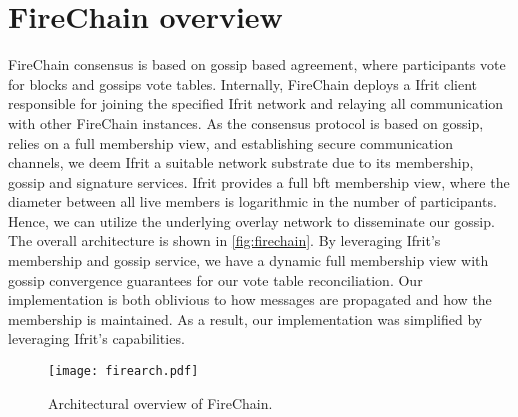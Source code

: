 \documentclass[USenglish]{uit-thesis}
\begin{document}


\section{FireChain overview}
FireChain consensus is based on gossip based agreement, where participants vote for blocks and gossips vote tables. 
Internally, FireChain deploys a Ifrit client responsible for joining the specified Ifrit network and relaying all communication with other FireChain instances.
As the consensus protocol is based on gossip, relies on a full membership view, and establishing secure communication channels, we deem Ifrit a suitable network substrate due to its membership, gossip and signature services.
Ifrit provides a full \gls{bft} membership view, where the diameter between all live members is logarithmic in the number of participants.
Hence, we can utilize the underlying overlay network to disseminate our gossip.  
The overall architecture is shown in \autoref{fig:firechain}.
By leveraging Ifrit's membership and gossip service, we have a dynamic full membership view with gossip convergence guarantees for our vote table reconciliation.
Our implementation is both oblivious to how messages are propagated and how the membership is maintained.
As a result, our implementation was simplified by leveraging Ifrit's capabilities.
\begin{figure}[H]
	\centering
	\texttt{[image: firearch.pdf]}
	\caption{Architectural overview of FireChain.}
	\label{fig:firechain}
\end{figure}
\end{document}
